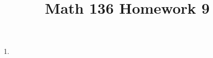 \documentclass{article}
\title{Math 136 Homework 9}
\begin{document}
    \maketitle
    \begin{enumerate}
      \item 
    \end{enumerate}
\end{document}
